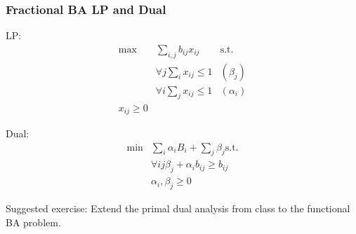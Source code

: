 \subsubsection{Fractional BA LP and Dual}
LP:
\begin{align*}
  \max &\sum_{i,j} b_{ij} x_{ij} &\mbox{s.t.} \\
  &\forall j \sum_{i} x_{ij} \leq 1 &(\beta_{j}) \\
  &\forall i \sum_{j} x_{ij} \leq 1 &(\alpha_{i}) \\
  x_{ij} \geq 0
\end{align*}

Dual:
\begin{align*}
  \min &\sum_{i} \alpha_{i} B_{i} + \sum_{j} \beta_{j} \mbox{s.t.} \\
  &\forall ij \beta_{j} + \alpha_{i} b_{ij} \geq b_{ij} \\
  &\alpha_{i}, \beta_{j} \geq 0
\end{align*}

Suggested exercise: Extend the primal dual analysis from class to the functional BA problem.

